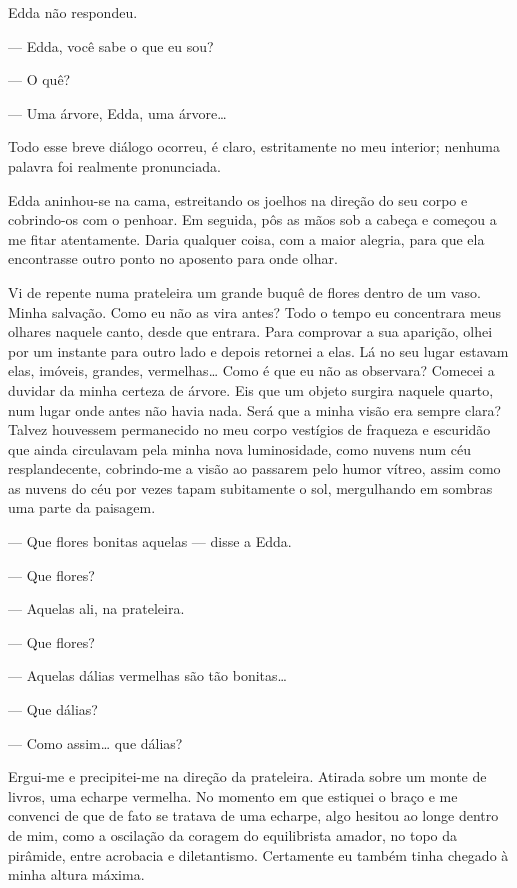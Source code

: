 Edda não respondeu.

--- Edda, você sabe o que eu sou?

--- O quê?

--- Uma árvore, Edda, uma árvore\ldots{}

Todo esse breve diálogo ocorreu, é claro, estritamente no meu interior; nenhuma palavra foi realmente pronunciada.

Edda aninhou-se na cama, estreitando os joelhos na direção do seu corpo e cobrindo-os com o penhoar. Em seguida, pôs as mãos sob a cabeça e começou a me fitar atentamente. Daria qualquer coisa, com a maior alegria, para que ela encontrasse outro ponto no aposento para onde olhar.

Vi de repente numa prateleira um grande buquê de flores dentro de um vaso. Minha salvação.
Como eu não as vira antes? Todo o tempo eu concentrara meus olhares naquele canto, desde que entrara. Para comprovar a sua aparição, olhei por um instante para outro lado e depois retornei a elas. Lá no seu lugar estavam elas, imóveis, grandes, vermelhas\ldots{} Como é que eu não as observara? Comecei a duvidar da minha certeza de árvore. Eis que um objeto surgira naquele quarto, num lugar onde antes não havia nada. Será que a minha visão era sempre clara? Talvez houvessem permanecido no meu corpo vestígios de fraqueza e escuridão que ainda circulavam pela minha nova luminosidade, como nuvens num céu resplandecente, cobrindo-me a visão ao passarem pelo humor vítreo, assim como as nuvens do céu por vezes tapam subitamente o sol, mergulhando em sombras uma parte da paisagem.

--- Que flores bonitas aquelas --- disse a Edda.

--- Que flores?

--- Aquelas ali, na prateleira.

--- Que flores?

--- Aquelas dálias vermelhas são tão bonitas\ldots{}

--- Que dálias?

--- Como assim\ldots{} que dálias?

Ergui-me e precipitei-me na direção da prateleira. Atirada sobre um monte de livros, uma echarpe vermelha. No momento em que estiquei o braço e me convenci de que de fato se tratava de uma echarpe, algo hesitou ao longe dentro de mim, como a oscilação da coragem do equilibrista amador, no topo da pirâmide, entre acrobacia e diletantismo. Certamente eu também tinha chegado à minha altura máxima.

